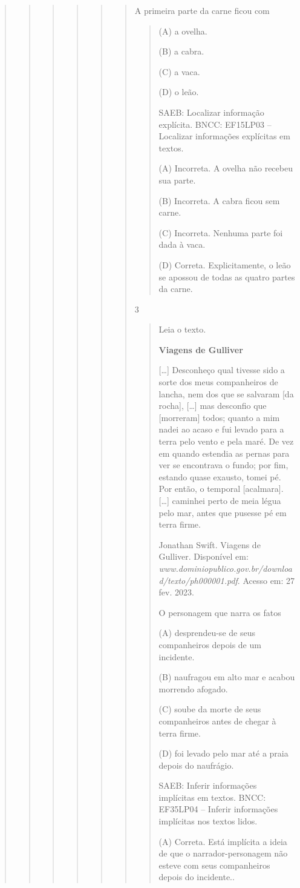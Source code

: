 \begin{boxlist}
{{\begin{quote}
\begin{quote}
\begin{quote}
{\begin{quote}
{\begin{quote}
\begin{quote}
A primeira parte da carne ficou com

\begin{quote}
(A) a ovelha.

(B) a cabra.

(C) a vaca.

(D) o leão.

SAEB: Localizar informação explícita.
BNCC: EF15LP03 -- Localizar informações explícitas em textos.

(A) Incorreta. A ovelha não recebeu sua parte.

(B) Incorreta. A cabra ficou sem carne.

(C) Incorreta. Nenhuma parte foi dada à vaca.

(D) Correta. Explicitamente, o leão se apossou de todas as quatro partes da carne.
\end{quote}

\num{3}

\begin{quote}
Leia o texto.

\textbf{Viagens de Gulliver}

{[}\ldots{}{]} Desconheço qual tivesse sido a sorte dos meus
companheiros de lancha, nem dos que se salvaram [da rocha],
{[}\ldots{}{]} mas desconfio que [morreram] todos; quanto a mim nadei ao
acaso e fui levado para a terra pelo vento e pela maré. De vez em quando
estendia as pernas para ver se encontrava o fundo; por fim, estando
quase exausto, tomei pé. Por então, o temporal [acalmara]. {[}\ldots{}{]}
caminhei perto de meia légua pelo mar, antes que pusesse pé em terra
firme.

Jonathan Swift. Viagens de Gulliver. Disponível em:
\emph{www.dominiopublico.gov.br/download/texto/ph000001.pdf}. Acesso em: 27
fev. 2023.

O personagem que narra os fatos

(A) desprendeu-se de seus companheiros depois de um incidente.

(B) naufragou em alto mar e acabou morrendo afogado.

(C) soube da morte de seus companheiros antes de chegar à terra firme.

(D) foi levado pelo mar até a praia depois do naufrágio.

SAEB: Inferir informações implícitas em textos.
BNCC: EF35LP04 -- Inferir informações implícitas nos textos lidos.

(A) Correta. Está implícita a ideia de que o narrador-personagem não esteve com seus companheiros depois do incidente..


\end{quote}
\end{quote}
\end{quote}}
\end{quote}}
\end{quote}
\end{quote}
\end{quote}}}
\end{boxlist}
